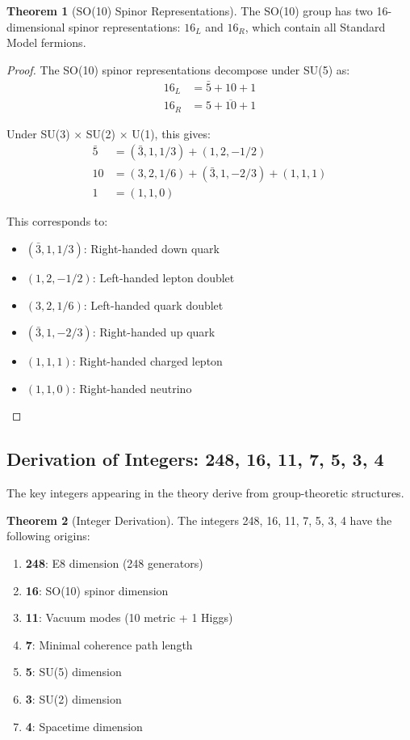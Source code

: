 \documentclass[11pt]{article}
\theoremstyle{definition}
\newtheorem{theorem}{Theorem}[section]
\begin{document}
\begin{theorem}[SO(10) Spinor Representations]
The SO(10) group has two 16-dimensional spinor representations: $16_L$ and $16_R$, which contain all Standard Model fermions.
\end{theorem}

\begin{proof}
The SO(10) spinor representations decompose under SU(5) as:
\begin{align}
16_L &= \bar{5} + 10 + 1 \\
16_R &= 5 + \overline{10} + 1
\end{align}

Under SU(3) × SU(2) × U(1), this gives:
\begin{align}
\bar{5} &= (\bar{3}, 1, 1/3) + (1, 2, -1/2) \\
10 &= (3, 2, 1/6) + (\bar{3}, 1, -2/3) + (1, 1, 1) \\
1 &= (1, 1, 0)
\end{align}

This corresponds to:
\begin{itemize}
\item $(\bar{3}, 1, 1/3)$: Right-handed down quark
\item $(1, 2, -1/2)$: Left-handed lepton doublet
\item $(3, 2, 1/6)$: Left-handed quark doublet
\item $(\bar{3}, 1, -2/3)$: Right-handed up quark
\item $(1, 1, 1)$: Right-handed charged lepton
\item $(1, 1, 0)$: Right-handed neutrino
\end{itemize}
\end{proof}

\subsection{Derivation of Integers: 248, 16, 11, 7, 5, 3, 4}

The key integers appearing in the theory derive from group-theoretic structures.

\begin{theorem}[Integer Derivation]
The integers 248, 16, 11, 7, 5, 3, 4 have the following origins:
\begin{enumerate}
\item \textbf{248}: E8 dimension (248 generators)
\item \textbf{16}: SO(10) spinor dimension
\item \textbf{11}: Vacuum modes (10 metric + 1 Higgs)
\item \textbf{7}: Minimal coherence path length
\item \textbf{5}: SU(5) dimension
\item \textbf{3}: SU(2) dimension
\item \textbf{4}: Spacetime dimension
\end{enumerate}
\end{theorem}
\end{document}
